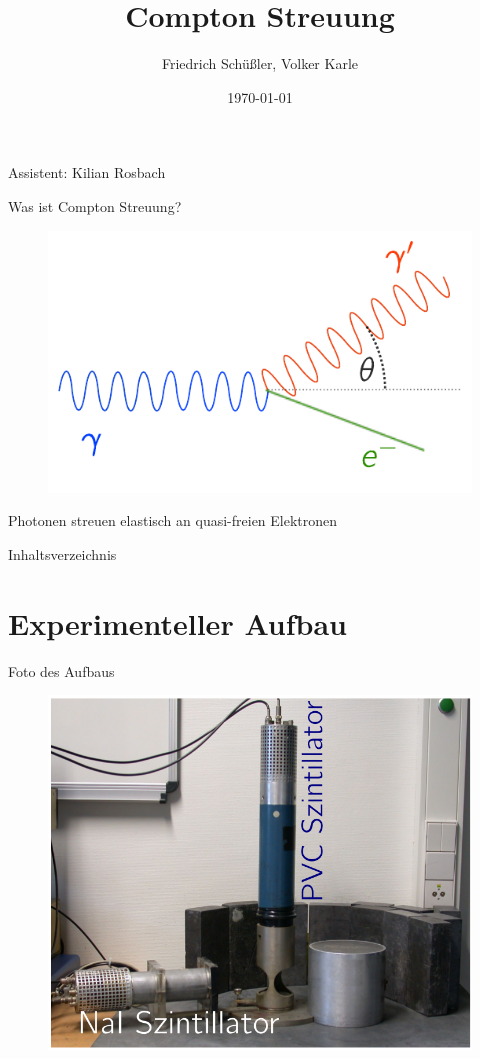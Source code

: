 \documentclass[xcolor=x11names,compress]{beamer}
\renewcommand{\(}{\begin{columns}}
\renewcommand{\)}{\end{columns}}
\newcommand{\<}[1]{\begin{column}{#1}}
\renewcommand{\>}{\end{column}}
\begin{document}
\begin{frame}{}
\title[Compton]{Compton Streuung}
\author{
Friedrich Schüßler, Volker Karle}
\date{\today}
\titlepage

\centering 
Assistent: Kilian Rosbach
\end{frame}
\begin{frame}[t]{Was ist Compton Streuung?}
\begin{figure}[htpb]
    \centering
    \includegraphics[width=0.6\linewidth]{../figures/compton_scatter}
\label{fig:intro}
\end{figure}
Photonen streuen elastisch an quasi-freien Elektronen
\end{frame}

\begin{frame}{Inhaltsverzeichnis}
    \tableofcontents
\end{frame}




\section{Experimenteller Aufbau}
\begin{frame}[t]{Foto des Aufbaus}
\begin{figure}[htpb]
    \centering
    \includegraphics[width=0.7\linewidth]{../figures/photographie1}
\label{fig:foto}
\end{figure}
\end{frame}
\end{document}
